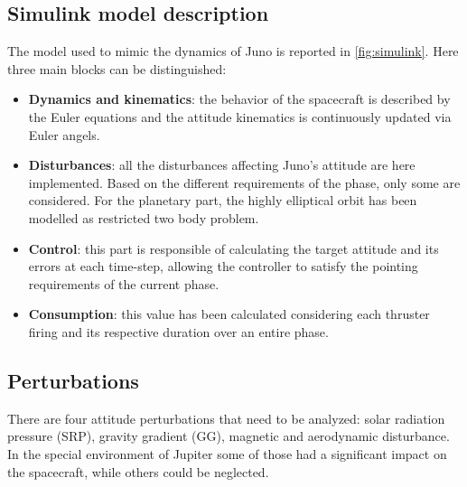 \subsection{Simulink model description}
\label{subsec:simulink}


The model used to mimic the dynamics of Juno is reported in \autoref{fig:simulink}. Here three main blocks can be distinguished:

\begin{itemize}
    \item \textbf{Dynamics and kinematics}: the behavior of the spacecraft is described by the Euler equations and the attitude kinematics is continuously updated via Euler angels. 
    \item \textbf{Disturbances}: all the disturbances affecting Juno's attitude are here implemented. Based on the different requirements of the phase, only some are considered. For the planetary part, the highly elliptical orbit has been modelled as restricted two body problem. 
    \item \textbf{Control}: this part is responsible of calculating the target attitude and its errors at each time-step, allowing the controller to satisfy the pointing requirements of the current phase. 
    \item \textbf{Consumption}: this value has been calculated considering each thruster firing and its respective duration over an entire phase. 
    
\end{itemize}

\subsection{Perturbations}
\label{subsec:perturbations}

There are four attitude perturbations that need to be analyzed: solar radiation pressure (SRP), gravity gradient (GG), magnetic and aerodynamic disturbance. In the special environment of Jupiter some of those had a significant impact on the spacecraft, while others could be neglected. 

